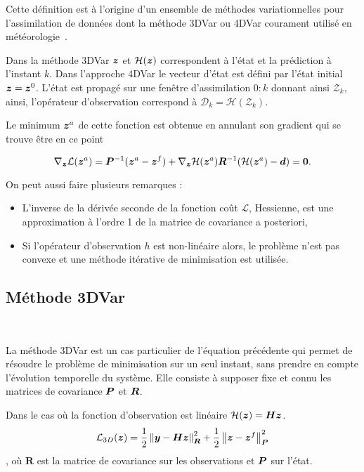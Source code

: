 Cette définition est à l'origine d'un ensemble de méthodes variationnelles pour l'assimilation de données dont la méthode 3DVar ou 4DVar courament utilisé en météorologie~\cite{talagrand1997assimilation}.

Dans la méthode 3DVar $\bm z$ et $\mathcal H(\bm z)$ correspondent à l'état et la prédiction à l'instant $k$. Dans l'approche 4DVar le vecteur d'état est défini par l'état initial $\bm z = \bm z^0$. L'état est propagé sur une fenêtre d'assimilation $0:k$ donnant ainsi $\mathcal{Z}_k$, ainsi, l'opérateur d'observation correspond à $\mathcal D_k = \mathcal H(\mathcal{Z}_k)$.

Le minimum $\bm z^a$ de cette fonction est obtenue en annulant son gradient qui se trouve être en ce point

\begin{equation*}
    \nabla_{\bm z} \mathcal L(\bm z^a) = \bm{P}^{-1} (\bm z^a - \bm z^f) + \nabla_{\bm z} \mathcal H (\bm z^a) \bm{R}^{-1}(\mathcal H(\bm z^a) - \bm d) = \bm 0.
\end{equation*}

On peut aussi faire plusieurs remarques :

\begin{itemize}
    \item L'inverse de la dérivée seconde de la fonction coût $\mathcal L$, Hessienne, est une approximation à l'ordre 1 de la matrice de covariance a posteriori,
    \item Si l'opérateur d'observation $h$ est non-linéaire alors, le problème n'est pas convexe et une méthode itérative de minimisation est utilisée.
\end{itemize}

\subsection{Méthode 3DVar}~\label{subsec:3dvar}

La méthode 3DVar est un cas particulier de l'équation précédente qui permet de résoudre le problème de minimisation sur un seul instant, sans prendre en compte l'évolution temporelle du système. Elle consiste à supposer fixe et connu les matrices de covariance $\bm{P}$ et $\bm{R}$.

Dans le cas où la fonction d'observation est linéaire $\mathcal H(\bm z) = \bm{H} \bm z$.
\begin{equation*}
    \mathcal L_{3D}(\bm z) = \frac{1}{2}\left\lVert \bm{y}-\bm{H} \bm z \right\rVert^2_{\bm R} + \frac{1}{2}\left\lVert \bm z-\bm z^f \right\rVert_{\bm{P}}^2
\end{equation*}, où $\bm R$ est la matrice de covariance sur les observations et $\bm{P}$ sur l'état.

